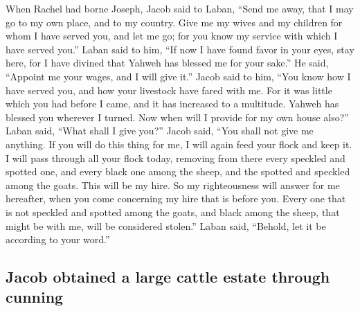  When Rachel had borne Joseph, Jacob said to Laban,
``Send me away, that I may go to my own place, and to my country.
 Give me my wives and my children for whom I have served
you, and let me go; for you know my service with which I have served
you.''  Laban said to him, ``If now I have found favor in
your eyes, stay here, for I have divined that Yahweh has blessed me for
your sake.''  He said, ``Appoint me your wages, and I
will give it.''  Jacob said to him, ``You know how I have
served you, and how your livestock have fared with me. 
For it was little which you had before I came, and it has increased to a
multitude. Yahweh has blessed you wherever I turned. Now when will I
provide for my own house also?''  Laban said, ``What
shall I give you?'' Jacob said, ``You shall not give me anything. If you
will do this thing for me, I will again feed your flock and keep it.
 I will pass through all your flock today, removing from
there every speckled and spotted one, and every black one among the
sheep, and the spotted and speckled among the goats. This will be my
hire.  So my righteousness will answer for me hereafter,
when you come concerning my hire that is before you. Every one that is
not speckled and spotted among the goats, and black among the sheep,
that might be with me, will be considered stolen.'' 
Laban said, ``Behold, let it be according to your word.''

\hypertarget{jacob-obtained-a-large-cattle-estate-through-cunning}{%
\subsection{Jacob obtained a large cattle estate through
cunning}\label{jacob-obtained-a-large-cattle-estate-through-cunning}}

